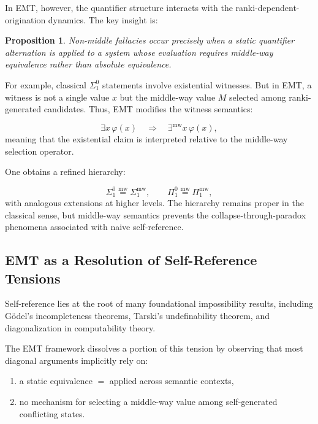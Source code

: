 \documentclass[11pt]{article}
\newcommand{\mweq}{\mathrel{\overset{\mathrm{mw}}{=}}}
\newtheorem{proposition}[theorem]{Proposition}
\theoremstyle{definition}
\theoremstyle{remark}
\begin{document}
In EMT, however, the quantifier structure interacts with the
ranki-dependent-origination dynamics. The key insight is:

\begin{proposition}
Non-middle fallacies occur precisely when a static quantifier alternation
is applied to a system whose evaluation requires middle-way
equivalence rather than absolute equivalence.
\end{proposition}

For example, classical $\Sigma^0_1$ statements involve existential
witnesses. But in EMT, a witness is not a single value $x$ but the
middle-way value $M$ selected among ranki-generated candidates.
Thus, EMT modifies the witness semantics:

\[
 \exists x\,\varphi(x)
 \quad\Longrightarrow\quad
 \exists^{{\mathrm{mw}}} x\,\varphi(x),
\]
meaning that the existential claim is interpreted relative to the
middle-way selection operator.

One obtains a refined hierarchy:

\[
   \Sigma^0_1 \mweq \Sigma^{{\mathrm{mw}}}_1,\qquad
   \Pi^0_1 \mweq \Pi^{{\mathrm{mw}}}_1,
\]
with analogous extensions at higher levels. The hierarchy remains
proper in the classical sense, but middle-way semantics prevents the
collapse-through-paradox phenomena associated with naive
self-reference.


\subsection{EMT as a Resolution of Self-Reference Tensions}

Self-reference lies at the root of many foundational impossibility
results, including G\"odel's incompleteness theorems, Tarski's
undefinability theorem, and diagonalization in computability theory.

The EMT framework dissolves a portion of this tension by observing
that most diagonal arguments implicitly rely on:

\begin{enumerate}
   \item a static equivalence $=$ applied across semantic contexts,
   \item no mechanism for selecting a middle-way value among
         self-generated conflicting states.
\end{enumerate}
\end{document}
